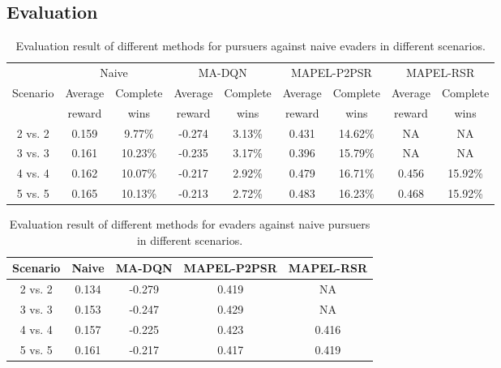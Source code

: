 \documentclass[conference]{IEEEtran}
\begin{document}
\subsection{Evaluation}

\begin{table}[]
    \centering
    \begin{tabular}{c  c c  c c  c c c c}
        \toprule
         & \multicolumn{2}{c}{Naive} & \multicolumn{2}{c}{MA-DQN} & \multicolumn{2}{c}{MAPEL-P2PSR} & \multicolumn{2}{c}{MAPEL-RSR} \\
         Scenario & Average & Complete & Average & Complete & Average & Complete & Average & Complete\\
         & reward & wins & reward & wins & reward & wins & reward & wins\\
         \midrule
         2 vs. 2 &   0.159 & 9.77\% &   -0.274 & 3.13\% & 0.431 & 14.62\% & NA & NA \\
         3 vs. 3 &   0.161 & 10.23\% &  -0.235 & 3.17\% & 0.396 & 15.79\% & NA & NA \\
         4 vs. 4 &   0.162 & 10.07\% &  -0.217 & 2.92\% & 0.479 & 16.71\% & 0.456 & 15.92\% \\
         5 vs. 5 &   0.165 & 10.13\% &  -0.213 & 2.72\% & 0.483 & 16.23\% & 0.468 & 15.92\% \\
         \bottomrule
    \end{tabular}
    \caption{Evaluation result of different methods for pursuers against naive evaders in different scenarios.}
    \label{tab:allpursuer}
\end{table}

\begin{table}[]
    \centering
    \begin{tabular}{c  c   c   c  c}
        \toprule
         Scenario & Naive & MA-DQN & MAPEL-P2PSR & MAPEL-RSR \\
         \midrule
         2 vs. 2 &   0.134  &  -0.279 &  0.419  & NA  \\
         3 vs. 3 &   0.153  &  -0.247 &  0.429  & NA  \\
         4 vs. 4 &   0.157  &  -0.225 &  0.423  & 0.416  \\
         5 vs. 5 &   0.161  &  -0.217 &  0.417  & 0.419  \\
         \bottomrule
    \end{tabular}
    \caption{Evaluation result of different methods for evaders against naive pursuers in different scenarios.}
    \label{tab:allevader}
\end{table}
\end{document}
